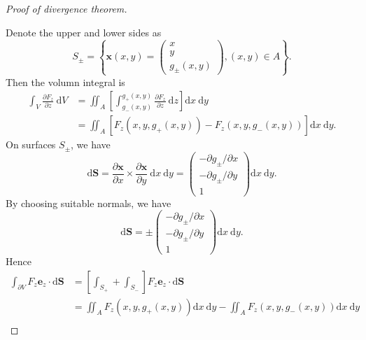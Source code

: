 \begin{proof}[Proof of divergence theorem]
\begin{center}
    \end{center}
    Denote the upper and lower sides as 
    \[
        S_{\pm}=\left\{\mathbf{x}(x, y)=\begin{pmatrix}
            x \\
            y \\
            g_{\pm}(x, y)
        \end{pmatrix},(x, y) \in A\right\}.
    \]
    Then the volumn integral is 
    \begin{align*}
        \int_{V} \frac{\partial F_{z}}{\partial z} \mathrm{~d} V &=\iint_{A}\left[\int_{g_{-}(x, y)}^{g_{+}(x, y)} \frac{\partial F_{z}}{\partial z} \mathrm{~d} z\right] \mathrm{d} x \mathrm{~d} y \\
        &=\iint_{A}\left[F_{z}\left(x, y, g_{+}(x, y)\right)-F_{z}\left(x, y, g_{-}(x, y)\right)\right] \mathrm{d} x \mathrm{~d} y .\tag{$*$}
    \end{align*}
    On surfaces $ S_{\pm} $, we have 
    \[
        \mathrm{d} \mathbf{S}=\frac{\partial \mathbf{x}}{\partial x} \times \frac{\partial \mathbf{x}}{\partial y} \mathrm{~d} x \mathrm{~d} y=\begin{pmatrix}
            -\partial g_{\pm} / \partial x \\
            -\partial g_{\pm} / \partial y \\
            1 
        \end{pmatrix} \mathrm{d} x \mathrm{~d} y.
    \]
    By choosing suitable normals, we have
    \[
        \mathrm{d} \mathbf{S}=\pm\begin{pmatrix}
            -\partial g_{\pm} / \partial x \\
            -\partial g_{\pm} / \partial y \\
            1
        \end{pmatrix} \mathrm{d} x \mathrm{~d} y.
    \]
    Hence 
    \begin{align*}
        \int_{\partial V} F_{z} \mathbf{e}_{z} \cdot \mathrm{d} \mathbf{S} &=\left[\int_{S_{+}}+\int_{S_{-}}\right] F_{z} \mathbf{e}_{z} \cdot \mathrm{d} \mathbf{S} \\
        &=\iint_{A} F_{z}\left(x, y, g_{+}(x, y)\right) \mathrm{d} x \mathrm{~d} y-\iint_{A} F_{z}\left(x, y, g_{-}(x, y)\right) \mathrm{d} x \mathrm{~d} y \\

\end{align*}
\end{proof}

